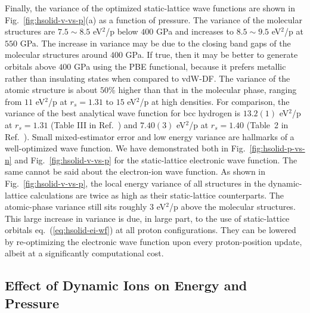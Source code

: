 Finally, the variance of the optimized static-lattice wave functions are shown in Fig.~\ref{fig:hsolid-v-vs-p}(a) as a function of pressure.
The variance of the molecular structures are $7.5\sim8.5$ eV$^2$/p below $400$ GPa and increases to $8.5\sim9.5$ eV$^2$/p at $550$ GPa.
The increase in variance may be due to the closing band gaps of the molecular structures around $400$ GPa.
If true, then it may be better to generate orbitals above $400$ GPa using the PBE functional, because it prefers metallic rather than insulating states when compared to vdW-DF.
The variance of the atomic structure is about $50$\% higher than that in the molecular phase, ranging from $11$ eV$^2$/p at $r_s=1.31$ to $15$ eV$^2$/p at high densities.
For comparison, the variance of the best analytical wave function for bcc hydrogen is $13.2(1)$ eV$^2$/p at $r_s=1.31$ (Table III in Ref.~\cite{Holzmann2003}) and $7.40(3)$ eV$^2$/p at $r_s=1.40$ (Table~2 in Ref.~\cite{Pierleoni2008}).
Small mixed-estimator error and low energy variance are hallmarks of a well-optimized wave function. We have demonstrated both in Fig.~\ref{fig:hsolid-p-vs-n} and Fig.~\ref{fig:hsolid-v-vs-p} for the static-lattice electronic wave function.
The same cannot be said about the electron-ion wave function.
As shown in Fig.~\ref{fig:hsolid-v-vs-p}, the local energy variance of all structures in the dynamic-lattice calculations are twice as high as their static-lattice counterparts.
The atomic-phase variance still sits roughly $3$ eV$^2$/p above the molecular structures.
This large increase in variance is due, in large part, to the use of static-lattice orbitals eq.~(\ref{eq:hsolid-ei-wf}) at all proton configurations.
They can be lowered by re-optimizing the electronic wave function upon every proton-position update, albeit at a significantly computational cost.

\subsection{Effect of Dynamic Ions on Energy and Pressure}

